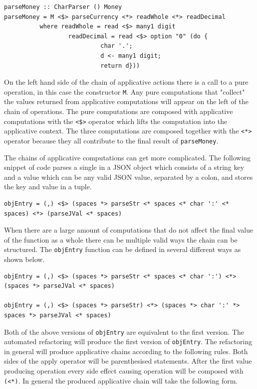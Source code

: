 \begin{lstlisting}[frame=tlrb]
parseMoney :: CharParser () Money
parseMoney = M <$> parseCurrency <*> readWhole <*> readDecimal
          where readWhole = read <$> many1 digit
                  readDecimal = read <$> option "0" (do { 
                           char '.';
                           d <- many1 digit;
                           return d}))
\end{lstlisting}

On the left hand side of the chain of applicative actions there is a call to a pure operation, in this case the constructor \texttt{M}. Any pure computations that "collect" the values returned from applicative computations will appear on the left of the chain of operations. The pure computations are composed with applicative computations with the \texttt{<\$>} operator which lifts the computation into the applicative context. The three computations are composed together with the \texttt{<*>} operator because they all contribute to the final result of \texttt{parseMoney}.

The chains of applicative computations can get more complicated. The following snippet of code parses a single in a JSON object which consists of a string key and a value which can be any valid JSON value, separated by a colon, and stores the key and value in a tuple. 

\begin{lstlisting}[frame=tblr]
objEntry = (,) <$> (spaces *> parseStr <* spaces <* char ':' <* spaces) <*> (parseJVal <* spaces)
\end{lstlisting}

When there are a large amount of computations that do not affect the final value of the function as a whole there can be multiple valid ways the chain can be structured. The \texttt{objEntry} function can be defined in several different ways as shown below.

\begin{lstlisting}[frame=tblr]
objEntry = (,) <$> (spaces *> parseStr <* spaces <* char ':') <*> (spaces *> parseJVal <* spaces)

objEntry = (,) <$> (spaces *> parseStr) <*> (spaces *> char ':' *> spaces *> parseJVal <* spaces)
\end{lstlisting}

Both of the above versions of \texttt{objEntry} are equivalent to the first version. The automated refactoring will produce the first version of \texttt{objEntry}. The refactoring in general will produce applicative chains according to the following rules. Both sides of the apply operator will be parenthesised statements. After the first value producing operation every side effect causing operation will be composed with \texttt{(<*)}. In general the produced applicative chain will take the following form.

